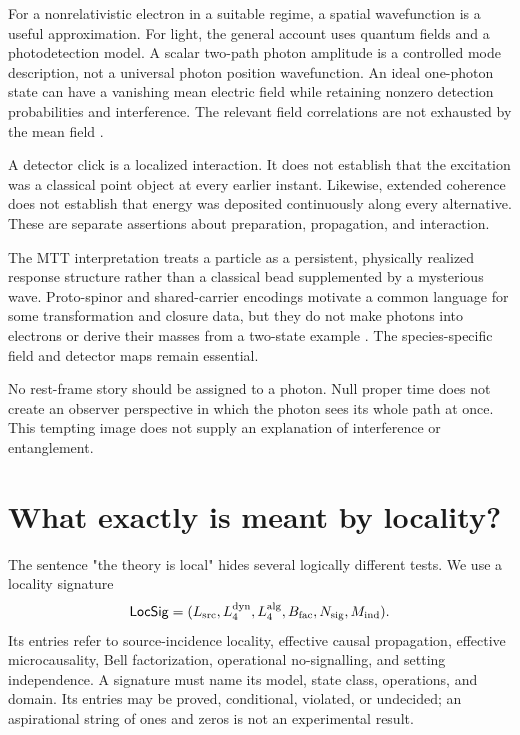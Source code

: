 \documentclass[11pt,a4paper]{article}
\newcommand{\LocSig}{\mathsf{LocSig}}
\begin{document}
For a nonrelativistic electron in a suitable regime, a spatial wavefunction is a useful approximation. For light, the general account uses quantum fields and a photodetection model. A scalar two-path photon amplitude is a controlled mode description, not a universal photon position wavefunction. An ideal one-photon state can have a vanishing mean electric field while retaining nonzero detection probabilities and interference. The relevant field correlations are not exhausted by the mean field \cite{Glauber}.

A detector click is a localized interaction. It does not establish that the excitation was a classical point object at every earlier instant. Likewise, extended coherence does not establish that energy was deposited continuously along every alternative. These are separate assertions about preparation, propagation, and interaction.

The MTT interpretation treats a particle as a persistent, physically realized response structure rather than a classical bead supplemented by a mysterious wave. Proto-spinor and shared-carrier encodings motivate a common language for some transformation and closure data, but they do not make photons into electrons or derive their masses from a two-state example \cite{NeroProto,NeroFoundation}. The species-specific field and detector maps remain essential.

No rest-frame story should be assigned to a photon. Null proper time does not create an observer perspective in which the photon sees its whole path at once. This tempting image does not supply an explanation of interference or entanglement.

\section{What exactly is meant by locality?}
\label{sec:locality}
The sentence "the theory is local" hides several logically different tests. We use a locality signature
\begin{equation}
\LocSig=(L_{\rm src},L_4^{\rm dyn},L_4^{\rm alg},
              B_{\rm fac},N_{\rm sig},M_{\rm ind}).
\end{equation}
Its entries refer to source-incidence locality, effective causal propagation, effective microcausality, Bell factorization, operational no-signalling, and setting independence. A signature must name its model, state class, operations, and domain. Its entries may be proved, conditional, violated, or undecided; an aspirational string of ones and zeros is not an experimental result.
\end{document}
